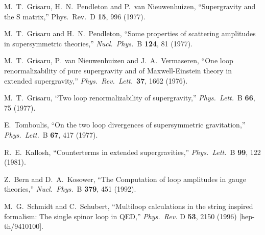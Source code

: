\documentclass[12pt]{livrev}
\begin{document}
\begin{thebibliography}{99}
M.~T.~Grisaru, H.~N.~Pendleton and P.~van Nieuwenhuizen,
``Supergravity and the S matrix,''
Phys.\ Rev.\ D {\bf 15}, 996 (1977).

M.~T.~Grisaru and H.~N.~Pendleton,
``Some properties of scattering amplitudes in supersymmetric theories,''
{\it Nucl.\ Phys.}\ B {\bf 124}, 81 (1977).

M.~T.~Grisaru, P.~van Nieuwenhuizen and J.~A.~Vermaseren,
``One loop renormalizability of pure supergravity and of 
Maxwell-Einstein theory in extended supergravity,''
{\it Phys.\ Rev.\ Lett.}\  {\bf 37}, 1662 (1976).

M.~T.~Grisaru,
``Two loop renormalizability of supergravity,''
{\it Phys.\ Lett.}\ B {\bf 66}, 75 (1977).

E.~Tomboulis,
``On the two loop divergences of supersymmetric gravitation,''
{\it Phys.\ Lett.}\ B {\bf 67}, 417 (1977).

R.~E.~Kallosh,
``Counterterms in extended supergravities,''
{\it Phys.\ Lett.}\ B {\bf 99}, 122 (1981).

Z.~Bern and D.~A.~Kosower,
``The Computation of loop amplitudes in gauge theories,''
{\it Nucl.\ Phys.}\ B {\bf 379}, 451 (1992).

M.~G.~Schmidt and C.~Schubert,
``Multiloop calculations in the string inspired formalism: 
The single spinor loop in QED,''
{\it Phys.\ Rev.} D {\bf 53}, 2150 (1996)
[hep-th/9410100].


\end{thebibliography}
\end{document}

